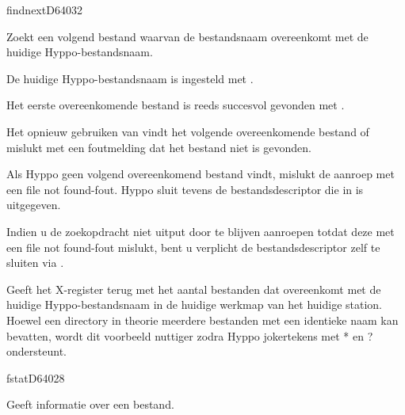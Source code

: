 %
\newpage
\begin{hyppotrap}{findnext}{D640}{32}

\item [Dienst:]  Zoekt een volgend bestand waarvan de bestandsnaam overeenkomt met de huidige Hyppo-bestandsnaam.
\item [Voorbeding:]  De huidige Hyppo-bestandsnaam is ingesteld met .

  Het eerste overeenkomende bestand is reeds succesvol gevonden met .
\item [Nawerking:]  Het opnieuw gebruiken van  vindt het volgende overeenkomende bestand of mislukt met een foutmelding dat het bestand niet is gevonden.
\item [Foutcodes:]  
\item [Geschiedenis:]
\item [Opmerkingen:]  Als Hyppo geen volgend overeenkomend bestand vindt, mislukt de aanroep met een file not found-fout. Hyppo sluit tevens de bestandsdescriptor die in  is uitgegeven.

  Indien u de zoekopdracht niet uitput door  te blijven aanroepen totdat deze met een file not found-fout mislukt, bent u verplicht de bestandsdescriptor zelf te sluiten via .\item [Voorbeeld:]  Geeft het X-register terug met het aantal bestanden dat overeenkomt met de huidige Hyppo-bestandsnaam in de huidige werkmap van het huidige station. Hoewel een directory in theorie meerdere bestanden met een identieke naam kan bevatten, wordt dit voorbeeld nuttiger zodra Hyppo jokertekens met * en ? ondersteunt.
\end{hyppotrap}


\newpage
\begin{hyppotrap}{fstat}{D640}{28}
\item [Dienst:]  Geeft informatie over een bestand.
\notimplemented
\end{hyppotrap}


